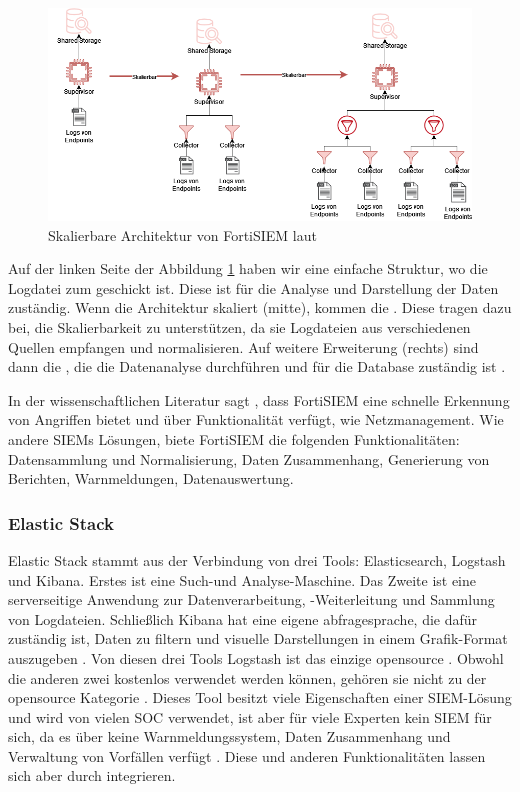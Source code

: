 \begin{figure}[H]
   \centering
   \includegraphics[width=1\textwidth]{assets/FortSIEM.drawio.png}
   \caption[Skalierbare Architektur von FortiSIEM]
   {Skalierbare Architektur von FortiSIEM laut \cite{Fortinet_Arch} }
   \label{fig:FortiSIEM}
   \centering
\end{figure}

Auf der linken Seite der Abbildung \ref{fig:FortiSIEM} haben wir eine einfache Struktur, wo die Logdatei zum  geschickt ist. Diese ist für die Analyse und Darstellung der Daten zuständig. Wenn die Architektur skaliert (mitte), kommen die . Diese tragen dazu bei, die Skalierbarkeit zu unterstützen, da sie Logdateien aus verschiedenen Quellen empfangen und normalisieren. Auf weitere Erweiterung (rechts) sind dann die , die die Datenanalyse durchführen und für die Database zuständig ist \citep{Fortinet_Key}.

In der wissenschaftlichen Literatur sagt \cite{Ramires_fortsiem}, dass FortiSIEM eine schnelle Erkennung von Angriffen bietet und über  Funktionalität verfügt, wie Netzmanagement. Wie andere \glspl{SIEM} Lösungen, biete FortiSIEM die folgenden Funktionalitäten: Datensammlung und Normalisierung, Daten Zusammenhang, Generierung von Berichten, Warnmeldungen, Datenauswertung.


\subsubsection{Elastic Stack}
Elastic Stack stammt aus der Verbindung von drei Tools: Elasticsearch, Logstash und Kibana. Erstes ist eine Such-und Analyse-Maschine. Das Zweite ist eine serverseitige Anwendung zur Datenverarbeitung, -Weiterleitung und Sammlung von Logdateien. Schließlich Kibana \label{kibana} hat eine eigene \gls{abfragesprache}, die dafür zuständig ist, Daten zu filtern und visuelle Darstellungen in einem Grafik-Format auszugeben \citep{packt_elkstack}. Von diesen drei Tools Logstash ist das einzige \gls{opensource} \citep{elastic_OSI}. Obwohl die anderen zwei kostenlos verwendet werden können, gehören sie nicht zu der \gls{opensource} Kategorie \citep{OpenSource_Def}. Dieses Tool besitzt viele Eigenschaften einer \gls{SIEM}-Lösung und wird von vielen SOC verwendet, ist aber für viele Experten kein \gls{SIEM} für sich, da es über keine Warnmeldungssystem, Daten Zusammenhang und Verwaltung von Vorfällen verfügt \citep{Miller_ELK}. Diese und anderen Funktionalitäten lassen sich aber durch  integrieren.

